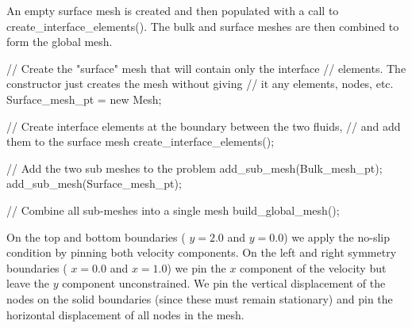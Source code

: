 An empty surface mesh is created and then populated with a call to {\ttfamily create\+\_\+interface\+\_\+elements()}. The bulk and surface meshes are then combined to form the global mesh.


\begin{DoxyCodeInclude}
 \textcolor{comment}{// Create the "surface" mesh that will contain only the interface}
 \textcolor{comment}{// elements. The constructor just creates the mesh without giving}
 \textcolor{comment}{// it any elements, nodes, etc.}
 Surface\_mesh\_pt = \textcolor{keyword}{new} Mesh;
 
 \textcolor{comment}{// Create interface elements at the boundary between the two fluids,}
 \textcolor{comment}{// and add them to the surface mesh}
 create\_interface\_elements();

 \textcolor{comment}{// Add the two sub meshes to the problem}
 add\_sub\_mesh(Bulk\_mesh\_pt);
 add\_sub\_mesh(Surface\_mesh\_pt);

 \textcolor{comment}{// Combine all sub-meshes into a single mesh}
 build\_global\_mesh();

\end{DoxyCodeInclude}


On the top and bottom boundaries ( $ y = 2.0 $ and $ y = 0.0 $) we apply the no-\/slip condition by pinning both velocity components. On the left and right symmetry boundaries ( $ x = 0.0 $ and $ x = 1.0 $) we pin the $ x $ component of the velocity but leave the $ y $ component unconstrained. We pin the vertical displacement of the nodes on the solid boundaries (since these must remain stationary) and pin the horizontal displacement of all nodes in the mesh.


